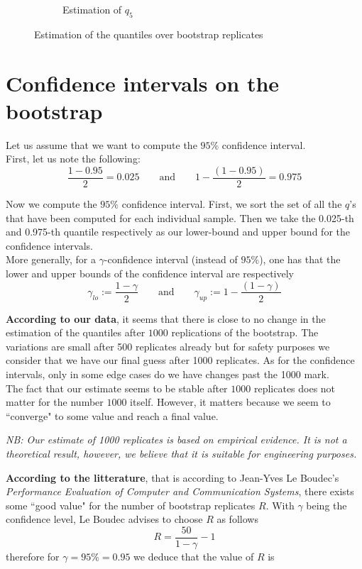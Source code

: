 \documentclass{article}
\begin{document}
\begin{figure}
\begin{subfigure}{.84\textwidth}
        \caption{Estimation of $q_5$}
    \end{subfigure}
    \caption{Estimation of the quantiles over bootstrap replicates}
    \label{fig: estimation of quantiles}
\end{figure}

\section{Confidence intervals on the bootstrap}
\label{section: confidence intervals on the bootstrap}

Let us assume that we want to compute the $95\%$ confidence interval. \\
First, let us note the following:
\begin{equation}
    \label{eq: compute 0.95 CI bounds}
    \frac{1 - 0.95}{2} = 0.025 \qquad \mbox{and} \qquad 1 - \frac{(1 - 0.95)}{2} = 0.975
\end{equation}

Now we compute the $95\%$ confidence interval. First, we sort the set of all the $q$'s that have been computed for each individual sample. Then we take the 0.025-th and 0.975-th quantile respectively as our lower-bound and upper bound for the confidence intervals. \\
More generally, for a $\gamma$-confidence interval (instead of $95\%$), one has that the lower and upper bounds of the confidence interval are respectively
\[
    \gamma_{lo} := \frac{1 - \gamma}{2} \qquad \mbox{and} \qquad \gamma_{up} := 1 - \frac{(1 - \gamma)}{2}
\]


\textbf{According to our data}, it seems that there is close to no change in the estimation of the quantiles after $1000$ replications of the bootstrap. The variations are small after 500 replicates already but for safety purposes we consider that we have our final guess after 1000 replicates. As for the confidence intervals, only in some edge cases do we have changes past the 1000 mark. \\
The fact that our estimate seems to be stable after \(1000\) replicates does not matter for the number \(1000\) itself. However, it matters because we seem to ``converge" to some value and reach a final value.

\textit{NB: Our estimate of 1000 replicates is based on empirical evidence. It is not a theoretical result, however, we believe that it is suitable for engineering purposes.}

\textbf{According to the litterature}, that is according to Jean-Yves Le Boudec's \textit{Performance Evaluation of Computer and Communication Systems}, there exists some ``good value" for the number of bootstrap replicates \(R\). With \(\gamma\) being the confidence level, Le Boudec advises to choose \(R\) as follows
\begin{equation}
    R = \frac{50}{1 - \gamma} - 1
\end{equation}
therefore for \(\gamma = 95\% = 0.95\) we deduce that the value of \(R\) is
\end{document}
